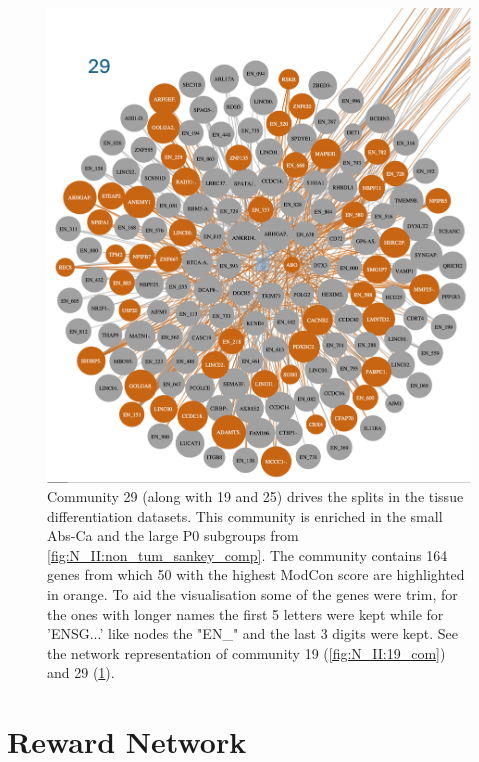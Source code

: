 \begin{figure}[H]    
    \centering
    \includegraphics[width=1.0\textwidth,height=1.0\textheight,keepaspectratio]{Sections/Network_II/resources/non_tum/29_com.png}
    \caption{Community 29 (along with 19 and 25) drives the splits in the tissue differentiation datasets. This community is enriched in the small Abs-Ca and the large P0 subgroups from \cref{fig:N_II:non_tum_sankey_comp}. The community contains 164 genes from which 50 with the highest ModCon score are highlighted in orange. To aid the visualisation some of the genes were trim, for the ones with longer names the first 5 letters were kept while for 'ENSG...' like nodes the "EN\_" and the last 3 digits were kept.  See the network representation of community 19 (\cref{fig:N_II:19_com}) and 29 (\cref{fig:ap:com_29}).}
    \label{fig:ap:com_29}
\end{figure}



\section{Reward Network}

